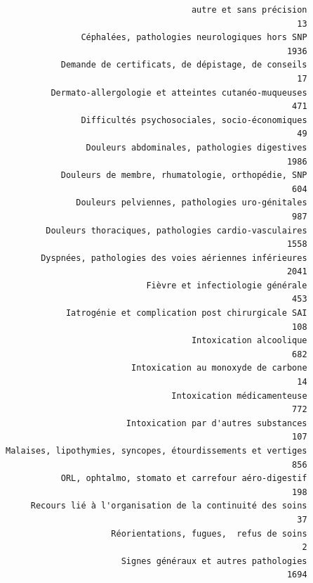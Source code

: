 \documentclass[]{article}
\begin{document}
\begin{verbatim}
                                     autre et sans précision 
                                                          13 
               Céphalées, pathologies neurologiques hors SNP 
                                                        1936 
           Demande de certificats, de dépistage, de conseils 
                                                          17 
         Dermato-allergologie et atteintes cutanéo-muqueuses 
                                                         471 
               Difficultés psychosociales, socio-économiques 
                                                          49 
                Douleurs abdominales, pathologies digestives 
                                                        1986 
           Douleurs de membre, rhumatologie, orthopédie, SNP 
                                                         604 
              Douleurs pelviennes, pathologies uro-génitales 
                                                         987 
        Douleurs thoraciques, pathologies cardio-vasculaires 
                                                        1558 
       Dyspnées, pathologies des voies aériennes inférieures 
                                                        2041 
                            Fièvre et infectiologie générale 
                                                         453 
            Iatrogénie et complication post chirurgicale SAI 
                                                         108 
                                     Intoxication alcoolique 
                                                         682 
                         Intoxication au monoxyde de carbone 
                                                          14 
                                 Intoxication médicamenteuse 
                                                         772 
                        Intoxication par d'autres substances 
                                                         107 
Malaises, lipothymies, syncopes, étourdissements et vertiges 
                                                         856 
           ORL, ophtalmo, stomato et carrefour aéro-digestif 
                                                         198 
     Recours lié à l'organisation de la continuité des soins 
                                                          37 
                     Réorientations, fugues,  refus de soins 
                                                           2 
                       Signes généraux et autres pathologies 
                                                        1694 

\end{verbatim}
\end{document}
